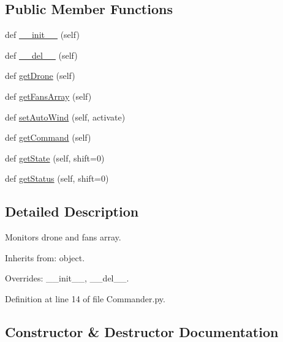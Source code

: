 \subsection*{Public Member Functions}
\begin{DoxyCompactItemize}
\item 
def \mbox{\hyperlink{classwindshape_1_1_commander_1_1_commander_ac3981f08b87030cbda690d7100e5c35c}{\+\_\+\+\_\+init\+\_\+\+\_\+}} (self)
\item 
def \mbox{\hyperlink{classwindshape_1_1_commander_1_1_commander_acc11cb334a91d601f066f8f560bdb168}{\+\_\+\+\_\+del\+\_\+\+\_\+}} (self)
\item 
def \mbox{\hyperlink{classwindshape_1_1_commander_1_1_commander_ad00a4b5be5f80bc13beef2d9ab6af3c4}{get\+Drone}} (self)
\item 
def \mbox{\hyperlink{classwindshape_1_1_commander_1_1_commander_a706de451ebba6d6c28dbb6db81ae1763}{get\+Fans\+Array}} (self)
\item 
def \mbox{\hyperlink{classwindshape_1_1_commander_1_1_commander_af0101ad8065016c602ceaf665ab63d6f}{set\+Auto\+Wind}} (self, activate)
\item 
def \mbox{\hyperlink{classwindshape_1_1_commander_1_1_commander_a5251ca75fd2309bac57fd4abf00b7963}{get\+Command}} (self)
\item 
def \mbox{\hyperlink{classwindshape_1_1_commander_1_1_commander_acb51776e8a0d70e32f93988565b78c40}{get\+State}} (self, shift=0)
\item 
def \mbox{\hyperlink{classwindshape_1_1_commander_1_1_commander_ac5457a24e8bf37f5e89aa16e6b210c9e}{get\+Status}} (self, shift=0)
\end{DoxyCompactItemize}


\subsection{Detailed Description}
\begin{DoxyVerb}Monitors drone and fans array.

Inherits from: object.

Overrides: __init__, __del__.
\end{DoxyVerb}
 

Definition at line 14 of file Commander.\+py.



\subsection{Constructor \& Destructor Documentation}
\mbox{\label{classwindshape_1_1_commander_1_1_commander_ac3981f08b87030cbda690d7100e5c35c}} 
